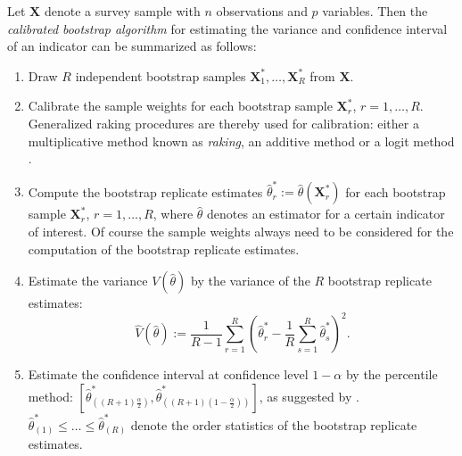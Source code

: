 \documentclass[12pt]{article}
\begin{document}
Let $\boldsymbol{X}$ %
denote a survey sample with $n$ observations and $p$ variables. Then the 
\emph{calibrated bootstrap algorithm} for estimating the variance and confidence 
interval of an indicator can be summarized as follows:
\begin{enumerate}
  \item Draw $R$ independent bootstrap samples $\boldsymbol{X}_{1}^{*}, \ldots, 
  \boldsymbol{X}_{R}^{*}$ from $\boldsymbol{X}$.
  \item Calibrate the sample weights for each bootstrap sample 
  $\boldsymbol{X}_{r}^{*}$, $r = 1, \ldots, R$. Generalized raking procedures 
  are thereby used for calibration: either a multiplicative method known as 
  \emph{raking}, an additive method or a logit method \citep[see][]{deville92, 
  deville93}.
  \item Compute the bootstrap replicate estimates $\hat{\theta}_{r}^{*} := 
  \hat{\theta}(\boldsymbol{X}_{r}^{*})$ for each bootstrap sample 
  $\boldsymbol{X}_{r}^{*}$, $r = 1, \ldots, R$, where $\hat{\theta}$ denotes an 
  estimator for a certain indicator of interest. Of course the sample weights 
  always need to be considered for the computation of the bootstrap replicate 
  estimates.
  \item Estimate the variance $V(\hat{\theta})$ by the variance of the $R$ 
  bootstrap replicate estimates:
  \begin{equation}
  \hat{V}(\hat{\theta}) := \frac{1}{R-1} \sum_{r=1}^{R} \left( 
  \hat{\theta}_{r}^{*} - \frac{1}{R} \sum_{s=1}^{R} \hat{\theta}_{s}^{*} 
  \right)^{2}.
  \end{equation}
  \item Estimate the confidence interval at confidence level $1 - \alpha$ by 
  the percentile method: $\left[ \hat{\theta}_{((R+1) 
    \frac{\alpha}{2})}^{*}, \hat{\theta}_{((R+1)(1-\frac{\alpha}{2}))}^{*} 
    \right]$, as suggested by \cite{efron93}.
  $\hat{\theta}_{(1)}^{*} 
  \leq \ldots \leq \hat{\theta}_{(R)}^{*}$ denote the order statistics of the 
  bootstrap replicate estimates.
\end{enumerate}
\end{document}

